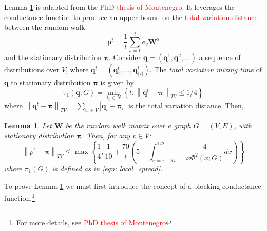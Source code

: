 \documentclass{article}
\newcommand{\set}[1]{\left\{#1\right\}}
\newcommand{\abs}[1]{\left \lvert #1 \right \rvert}
\newcommand{\norm}[1]{\left\lVert#1\right\rVert}
\newcommand{\1}{\mathbf{1}}
\newcommand{\qbf}{\mathbf{q}}
\newcommand{\pibf}{\bm{\pi}}
\newcommand{\rhobf}{\bm{\rho}}
\newcommand{\Wbf}{\mathbf{W}}
\theoremstyle{aldenthm}
\newtheorem{lemma}{Lemma}
\begin{document}
Lemma \ref{lem: montenegro} is adapted from the \textcolor{red}{PhD thesis of Montenegro.} It leverages the conductance function to produce an upper bound on the \textcolor{red}{total variation distance} between the random walk 
\begin{equation}
\label{eqn: uniform_stopping_random_walk}
\rhobf^t = \frac{1}{t} \sum_{s = 1}^{t} e_v \Wbf^s
\end{equation}
and the stationary distribution $\pibf$. Consider $\qbf = (\qbf^1, \qbf^2, \ldots)$ a sequence of distributions over $V$, where $\qbf^t = (\qbf_1^t, \ldots, \qbf_{\abs{V}}^t)$. The \emph{total variation mixing time} of $\qbf$ to stationary distribution $\pibf$ is given by
\begin{equation*}
\tau_1(\qbf; G) = \min_{t_0 \in N} \set{t: \norm{\qbf^t - \pibf}_{TV} \leq 1/4}
\end{equation*}
where $\norm{\qbf^t - \pibf}_{TV} = \sum_{v_i \in V} \abs{\qbf_i - \pibf_i}$ is the total variation distance. Then,

\begin{lemma}
	\label{lem: montenegro}
	Let $\Wbf$ be the random walk matrix over a graph $G = (V,E)$, with stationary distribution $\pibf$. Then, for any $v \in V$:
	\begin{equation*}
	\norm{\rho^t - \pibf}_{TV} \leq \max\left\{ \frac{1}{4}, \frac{1}{10} +  \frac{70}{t}\left(5 + \int_{x = \pi_1(G)}^{1/2} \frac{4}{x \Phi^2(x; G)} dx\right) \right\}
	\end{equation*}
	where $\pi_1(G)$ is defined as in \eqref{eqn: local_spread}.
\end{lemma}

To prove Lemma \ref{lem: montenegro} we must first introduce the concept of a blocking conductance function.\footnote{For more details, see \textcolor{red}{PhD thesis of Montenegro}}
\end{document}
